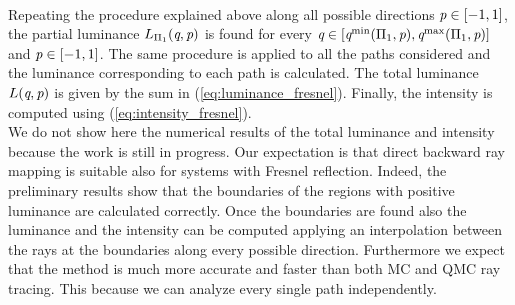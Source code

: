 \\\indent 
Repeating the procedure explained above along all possible directions $\textit{p}\in[-1,1]$, the partial luminance $L_{\Pi_1}(\textit{q}, \textit{p})$ is found for every $\textit{q}\in[\textit{q}^{\textrm{min}}(\Pi_1,\textit{p}), \textit{q}^{\textrm{max}}(\Pi_1,\textit{p})]$ and $\textit{p}\in[-1,1]$. The same procedure is applied to all the paths considered and the luminance corresponding to each path is calculated. The total luminance $L(\textit{q}, \textit{p})$ is given by the sum in (\ref{eq:luminance_fresnel}). Finally, the intensity is computed using (\ref{eq:intensity_fresnel}). \\ \indent
We do not show here the numerical results of the total luminance and intensity because the work is still in progress. Our expectation is that direct backward ray mapping is suitable also for systems with Fresnel reflection. Indeed, the preliminary results show that the boundaries of the regions with positive luminance are calculated correctly. Once the boundaries are found also the luminance and the intensity can be computed applying an interpolation between the rays at the boundaries along every possible direction. Furthermore we expect that the method is much more accurate and faster than both MC and QMC ray tracing. This because we can analyze every single path independently.  

